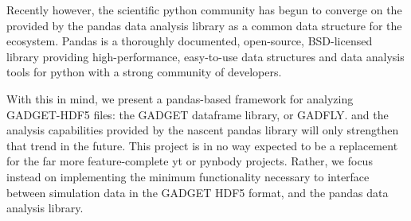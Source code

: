 Recently however, the scientific python community has begun to converge on the  provided by the pandas data analysis library as a common data structure for the ecosystem. 
Pandas is a thoroughly documented, open-source, BSD-licensed library providing high-performance, easy-to-use data structures and data analysis tools for python with a strong community of developers. 

With this in mind, we present a pandas-based framework for analyzing GADGET-HDF5 files: the GADGET dataframe library, or GADFLY.
and the analysis capabilities provided by the nascent pandas library will only strengthen that trend in the future.  
This project is in no way expected to be a replacement for the far more feature-complete yt or pynbody projects. Rather, we focus instead on implementing the minimum functionality necessary to interface between simulation data in the GADGET HDF5 format, and the pandas data analysis library.%
